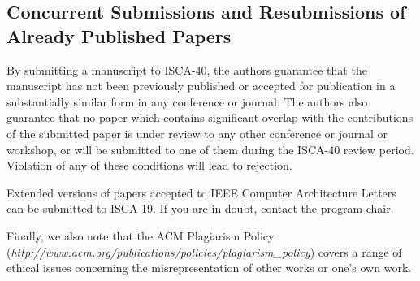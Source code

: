 \documentclass[pageno]{jpaper}
\begin{document}
\subsection{Concurrent Submissions and Resubmissions of Already Published Papers}

By submitting a manuscript to ISCA-40, the authors guarantee that the
manuscript has not been previously published or accepted for publication in a
substantially similar form in any conference or journal. The authors also
guarantee that no paper which contains significant overlap with the
contributions of the submitted paper is under review to any other conference or
journal or workshop, or will be submitted to one of them during the ISCA-40
review period. Violation of any of these conditions will lead to rejection.

Extended versions of papers accepted to IEEE Computer Architecture Letters can
be submitted to ISCA-19.  If you are in doubt, contact the program chair.

Finally, we also note that the ACM Plagiarism Policy ({\em http://www.acm.org/publications/policies/plagiarism\_policy}) covers a range of ethical issues concerning the misrepresentation of other works or one's own work.



\end{document}
